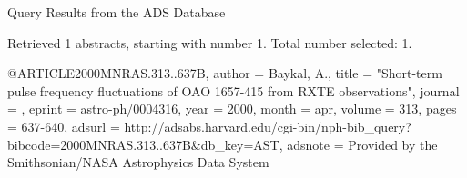 Query Results from the ADS Database


Retrieved 1 abstracts, starting with number 1.  Total number selected: 1.

@ARTICLE{2000MNRAS.313..637B,
   author = {{Baykal}, A.},
    title = "{Short-term pulse frequency fluctuations of OAO 1657-415 from RXTE observations}",
  journal = {\mnras},
   eprint = {astro-ph/0004316},
     year = 2000,
    month = apr,
   volume = 313,
    pages = {637-640},
   adsurl = {http://adsabs.harvard.edu/cgi-bin/nph-bib_query?bibcode=2000MNRAS.313..637B&db_key=AST},
  adsnote = {Provided by the Smithsonian/NASA Astrophysics Data System}
}


